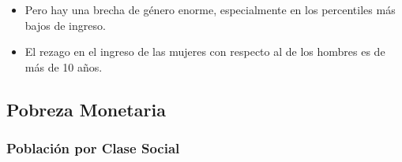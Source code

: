     \begin{tcolorbox}[enhanced, colback=mycolor,colframe=mycolor,drop fuzzy shadow,watermark color=white,
                        title=Principales Resultados]
    
                    \begin{itemize}
                    \item Pero hay una brecha de género enorme, especialmente en los percentiles más bajos de ingreso.
                    \item El rezago en el ingreso de las mujeres con respecto al de los hombres es de más de 10 años.
                \end{itemize}
     
    \end{tcolorbox}

    \subsection{Pobreza Monetaria}

        \subsubsection{Población por Clase Social}

